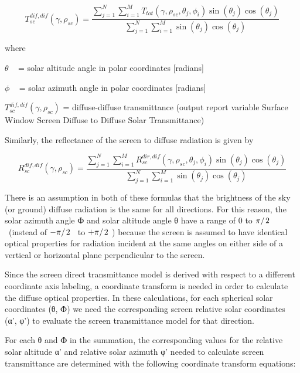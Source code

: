 \begin{equation}
T_{sc}^{dif,dif}(\gamma ,{\rho_{sc}}) = \frac{{\sum\limits_{j = 1}^N {\sum\limits_{i = 1}^M {{T_{tot}}(\gamma ,{\rho_{sc}},{\theta_j},{\phi_i})\sin ({\theta_j})\cos ({\theta_j})} } }}{{\sum\limits_{j = 1}^N {\sum\limits_{i = 1}^M {\sin ({\theta_j})\cos ({\theta_j})} } }}
\end{equation}

where

\(\theta\) ~ = solar altitude angle in polar coordinates {[}radians{]}

\(\phi\) ~ = solar azimuth angle in polar coordinates {[}radians{]}

\(T_{sc}^{dif,dif}(\gamma ,{\rho_{sc}})\) = diffuse-diffuse transmittance (output report variable Surface Window Screen Diffuse to Diffuse Solar Transmittance)

Similarly, the reflectance of the screen to diffuse radiation is given by

\begin{equation}
R_{sc}^{dif,dif}(\gamma ,{\rho_{sc}}) = \frac{{\sum\limits_{j = 1}^N {\sum\limits_{i = 1}^M {R_{sc}^{dir,dif}(\gamma ,{\rho_{sc}},{\theta_j},{\phi_i})\sin ({\theta_j})\cos ({\theta_j})} } }}{{\sum\limits_{j = 1}^N {\sum\limits_{i = 1}^M {\sin ({\theta_j})\cos ({\theta_j})} } }}
\end{equation}

There is an assumption in both of these formulas that the brightness of the sky (or ground) diffuse radiation is the same for all directions. For this reason, the solar azimuth angle Ф and solar altitude angle θ have a range of 0 to \({\pi \mathord{\left/ {\vphantom {\pi 2}} \right. } 2}\) ~(instead of \({{ - \pi } \mathord{\left/ {\vphantom {{ - \pi } 2}} \right. } 2}\) ~to \({{ + \pi } \mathord{\left/ {\vphantom {{ + \pi } 2}} \right. } 2}\) ) because the screen is assumed to have identical optical properties for radiation incident at the same angles on either side of a vertical or horizontal plane perpendicular to the screen.

Since the screen direct transmittance model is derived with respect to a different coordinate axis labeling, a coordinate transform is needed in order to calculate the diffuse optical properties. In these calculations, for each spherical solar coordinates (θ, Ф) we need the corresponding screen relative solar coordinates (α', φ') to evaluate the screen transmittance model for that direction.

For each θ and Ф in the summation, the corresponding values for the relative solar altitude α' and relative solar azimuth φ' needed to calculate screen transmittance are determined with the following coordinate transform equations:

